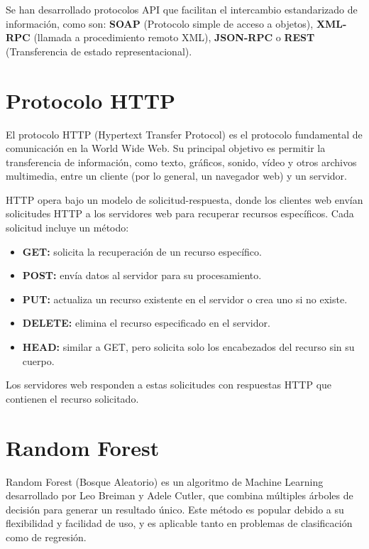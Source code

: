 Se han desarrollado protocolos API que facilitan el intercambio estandarizado de información, como son: \textbf{SOAP} (Protocolo simple de acceso a objetos), \textbf{XML-RPC} (llamada a procedimiento remoto XML), \textbf{JSON-RPC} o \textbf{REST} (Transferencia de estado representacional).

\hfill

\section{Protocolo HTTP}

El protocolo HTTP \cite{http} (Hypertext Transfer Protocol) es el protocolo fundamental de comunicación en la World Wide Web. Su principal objetivo es permitir la transferencia de información, como texto, gráficos, sonido, vídeo y otros archivos multimedia, entre un cliente (por lo general, un navegador web) y un servidor.

HTTP opera bajo un modelo de solicitud-respuesta, donde los clientes web envían solicitudes HTTP a los servidores web para recuperar recursos específicos. Cada solicitud incluye un método:
\begin{itemize}
\tightlist
    \item
        \textbf{GET:} solicita la recuperación de un recurso específico.
    \item 
        \textbf{POST:} envía datos al servidor para su procesamiento.
    \item 
        \textbf{PUT:} actualiza un recurso existente en el servidor o crea uno si no existe.
    \item 
        \textbf{DELETE:} elimina el recurso especificado en el servidor.
    \item 
        \textbf{HEAD:} similar a GET, pero solicita solo los encabezados del recurso sin su cuerpo.
\end{itemize}

Los servidores web responden a estas solicitudes con respuestas HTTP que contienen el recurso solicitado.

\hfill

\section{Random Forest}
Random Forest (Bosque Aleatorio) \cite{random_forest} es un algoritmo de Machine Learning desarrollado por Leo Breiman y Adele Cutler, que combina múltiples árboles de decisión para generar un resultado único. Este método es popular debido a su flexibilidad y facilidad de uso, y es aplicable tanto en problemas de clasificación como de regresión.


